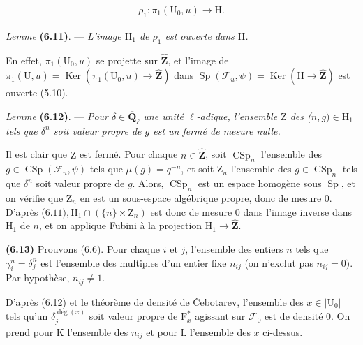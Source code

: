 \documentclass[10pt,leqno]{article}
\begin{document}
\begin{equation*}\begin{gathered}\rho _{1} : \pi _{1}(\mathrm{U}_{0},u) \longrightarrow  \mathrm{H}.\end{gathered}\end{equation*}

\noindent \emph{Lemme} \textbf{(6.11)}. — {\itshape L’image \(\mathrm{H}_{1}\) de \(\rho _{1}\) est ouverte dans \(\mathrm{H}\).}\par

\noindent En effet, \(\pi _{1}(\mathrm{U}_{0},u)\) se projette sur \(\widehat{\mathbf{Z}}\), et l’image de \(\pi _{1}(\mathrm{U},u)=\operatorname{Ker}(\pi _{1}(\mathrm{U}_{0},u)\longrightarrow \widehat{\mathbf{Z}})\) dans \(\operatorname{Sp}(\mathcal{F} _{u},\psi )=\operatorname{Ker}(\mathrm{H}\longrightarrow \widehat{\mathbf{Z}})\) est ouverte (5.10).\par

\noindent \emph{Lemme} \textbf{(6.12)}. — {\itshape Pour \(\delta \in \overline{\mathbf{Q}}_{\ell }\) une unité \(\ell \)-adique, l’ensemble \(\mathrm{Z}\) des (\(n,g)\in \mathrm{H}_{1}\) tels que \(\delta ^{n}\) soit valeur propre de \(g\) est un fermé de mesure nulle.}\par

\noindent Il est clair que \(\mathrm{Z}\) est fermé. Pour chaque \(n\in \widehat{\mathbf{Z}}\), soit \(\operatorname{CSp}_{n}\) l’ensemble des \(g\in \operatorname{CSp}(\mathcal{F} _{u},\psi )\) tels que \(\mu (g)=q^{- n}\), et soit \(\mathrm{Z}_{n}\) l’ensemble des \(g\in \operatorname{CSp}_{n}\) tels que \(\delta ^{n}\) soit valeur propre de \(g\). Alors, \(\operatorname{CSp}_{n}\) est un espace homogène sous \(\operatorname{Sp}\), et on vérifie que \(\mathrm{Z}_{n}\) en est un sous-espace algébrique propre, donc de mesure 0. D’après (\(6.11), \mathrm{H}_{1}\cap (\{n\}\times \mathrm{Z}_{n})\) est donc de mesure 0 dans l’image inverse dans \(\mathrm{H}_{1}\) de \(n\), et on applique Fubini à la projection \(\mathrm{H}_{1}\longrightarrow \widehat{\mathbf{Z}}\).\par

\noindent \textbf{(6.13)} Prouvons (6.6). Pour chaque \(i\) et \(j\), l’ensemble des entiers \(n\) tels que \(\gamma _{i}^{n}=\delta _{j}^{n}\) est l’ensemble des multiples d’un entier fixe \(n_{ij}\) (on n’exclut pas \(n_{ij}=0)\). Par hypothèse, \(n_{ij}\ne 1\).\par

\noindent D’après (6.12) et le théorème de densité de Čebotarev, l’ensemble des \(x\in |\mathrm{U}_{0}|\) tels qu’un \(\delta _{j}^{\operatorname{deg}(x)}\) soit valeur propre de \(\mathrm{F}_{x}^{*}\) agissant sur \(\mathcal{F} _{0}\) est de densité 0. On prend pour \(\mathrm{K}\) l’ensemble des \(n_{ij}\) et pour \(\mathrm{L}\) l’ensemble des \(x\) ci-dessus.\par
\end{document}
